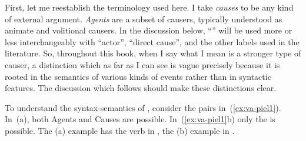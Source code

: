 \begin{exe}
\begin{xlist}
\begin{exe}
\begin{xlist}
\begin{exe}
\begin{xlist}
\begin{exe}
\begin{exe}
\begin{xlist}
\begin{exe}
\begin{xlist}
\begin{exe}
\begin{xlist}
\begin{exe}
\begin{xlist}
\begin{exe}
\begin{xlist}
\begin{exe}
\begin{xlist}
\begin{exe}
\begin{xlist}
\begin{exe}
\begin{xlist}
\begin{exe}
\begin{xlist}
\begin{exe}
\begin{xlist}
\begin{exe}
\begin{xlist}
\begin{exe}
\begin{xlist}
\begin{exe}
\begin{exe}
\begin{xlist}
\begin{exe}
\begin{xlist}
\begin{exe}
\begin{xlist}
\begin{exe}
\begin{xlist}
{\begin{exe}
\begin{xlist}
\begin{exe}
\begin{xlist}
\begin{exe}
\begin{xlist}
\begin{exe}
\begin{xlist}
\begin{xlist}
\begin{xlist}
\begin{exe}
\begin{xlist}
\begin{xlist}
\begin{xlist}
\begin{exe}
\begin{exe}
\begin{xlist}
First, let me reestablish the terminology used here. I take \emph{causes} to be any kind of external argument. \emph{Agents} are a subset of causers, typically understood as animate and volitional causers. In the discussion below, ``'' will be used more or less interchangeably with ``actor'', ``direct cause'', and the other labels used in the literature. So, throughout this book, when I say \emph{} what I mean is a stronger type of causer, a distinction which as far as I can see is vague precisely because it is rooted in the semantics of various kinds of events rather than in syntactic features. The discussion which follows should make these distinctions clear.

To understand the syntax-semantics of {\tpie}, consider the pairs in~(\ref{ex:va-piel1}). In~(\nextx a), both Agents and Causes are possible. In~(\ref{ex:va-piel1}b) only the  is possible. The (a) example has the verb in {\tkal}, the (b) example in {\tpie}.

 \begin{exe}
 \ex  \label{ex:va-piel1} 
 \begin{xlist} 
		

\end{xlist}
\end{exe}
\end{xlist}
\end{exe}
\end{exe}
\end{xlist}
\end{xlist}
\end{xlist}
\end{exe}
\end{xlist}
\end{xlist}
\end{xlist}
\end{exe}
\end{xlist}
\end{exe}
\end{xlist}
\end{exe}
\end{xlist}
\end{exe}}
\end{xlist}
\end{exe}
\end{xlist}
\end{exe}
\end{xlist}
\end{exe}
\end{xlist}
\end{exe}
\end{exe}
\end{xlist}
\end{exe}
\end{xlist}
\end{exe}
\end{xlist}
\end{exe}
\end{xlist}
\end{exe}
\end{xlist}
\end{exe}
\end{xlist}
\end{exe}
\end{xlist}
\end{exe}
\end{xlist}
\end{exe}
\end{xlist}
\end{exe}
\end{xlist}
\end{exe}
\end{xlist}
\end{exe}
\end{xlist}
\end{exe}
\end{exe}
\end{xlist}
\end{exe}
\end{xlist}
\end{exe}
\end{xlist}
\end{exe}

